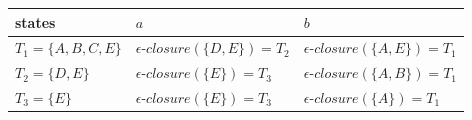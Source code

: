 \documentclass{standalone}
\providecommand\lightrule{%
	\arrayrulecolor{black!30}%
	\midrule[\lightrulewidth]%
	\arrayrulecolor{black}}
\begin{document}
\begin{tabularx}{\textwidth}{XXX}
        states & \(a\) & \(b\) \\
        \midrule
            \(T_1 = \{A, B, C, E\}\)
            &
            \(\epsilon \textrm{-}closure(\{D, E\}) = T_2\)
            &
            \(\epsilon \textrm{-}closure(\{A, E\}) = T_1\)
            \\ \lightrule
            \(T_2 = \{D, E\}\)
            &
            \(\epsilon \textrm{-}closure(\{E\}) = T_3\)
            &
            \(\epsilon \textrm{-}closure(\{A, B\}) = T_1\)
            \\ \lightrule
            \(T_3 = \{E\}\)
            &
            \(\epsilon \textrm{-}closure(\{E\}) = T_3\)
            &
            \(\epsilon \textrm{-}closure(\{A\}) = T_1\)
\end{tabularx}
\end{document}
